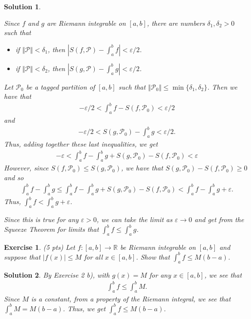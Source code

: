 \documentclass[12pt]{article}
\newcommand{\bR}{\mathbb{R}}
\newcommand{\cP}{\mathcal{P}}
\newcommand{\ra}{\rightarrow}
\theoremstyle{plain}
\newtheorem{exer}{\textbf{Exercise}}}
\theoremstyle{plain}
\newtheorem*{sol}{\textbf{Solution}}}
\theoremstyle{plain}
\theoremstyle{plain}
\begin{document}
\begin{sol}
\begin{enumerate}[label=\textbf{\alph*)}]
Since $f$ and $g$ are Riemann integrable on $[a , b]$, there are numbers $\delta_1, \delta_2 > 0$ such that
	\begin{itemize}
	\item if $\Vert \cP \Vert < \delta_1$, then $|S (f , \cP ) - \int_a^b f | < \varepsilon/2$.
	\item if $\Vert \cP \Vert < \delta_2$, then $|S (g, \cP ) - \int_a^b g| < \varepsilon/2$.
	\end{itemize}
Let $\cP_0$ be a tagged partition of $[a, b]$ such that $\Vert \cP_0 \Vert \leq \min \{ \delta_1 , \delta_2 \}$. Then we have that
	\begin{align*}
	- \varepsilon/2 < \int_a^b f - S (f , \cP_0 ) < \varepsilon/2
	\end{align*}
and
	\begin{align*}
	-\varepsilon /2< S (g, \cP_0 ) - \int_a^b g < \varepsilon/2 .
	\end{align*}
Thus, adding together these last inequalities, we get
	\begin{align*}
	- \varepsilon < \int_a^b f - \int_a^b g + S (g, \cP_0 ) - S (f, \cP_0 ) < \varepsilon
	\end{align*}
However, since $S (f , \cP_0 ) \leq S (g , \cP_0 )$, we have that $S (g, \cP_0 ) - S (f ,\cP_0 ) \geq 0$ and so
	\begin{align*}
	\int_a^b f - \int_a^b g \leq \int_a^b f - \int_a^b g + S(g , \cP_0 ) - S (f , \cP_0 ) < \int_a^b f - \int_a^b g + \varepsilon .
	\end{align*}
Thus, $\int_a^b f < \int_a^b g + \varepsilon$.

Since this is true for any $\varepsilon > 0$, we can take the limit as $\varepsilon \ra 0$ and get from the Squeeze Theorem for limits that $\int_a^b f \leq \int_a^b g$.
\end{enumerate}
\end{sol}

\begin{exer}
(5 pts)
Let $f : [a, b] \ra \bR$ be Riemann integrable on $[a, b]$ and suppose that $|f(x)| \leq M$ for all $x \in [a, b]$. Show that $\int_a^b f \leq M (b - a)$.
\end{exer}
\begin{sol}
By Exercise 2 b), with $g (x) = M$ for any $x \in [a, b]$, we see that
	\begin{align*}
	\int_a^b f \leq \int_a^b M .
	\end{align*}
Since $M$ is a constant, from a property of the Riemann integral, we see that $\int_a^b M = M (b - a)$. Thus, we get $\int_a^b f \leq M (b - a)$.
\end{sol}
\end{document}
